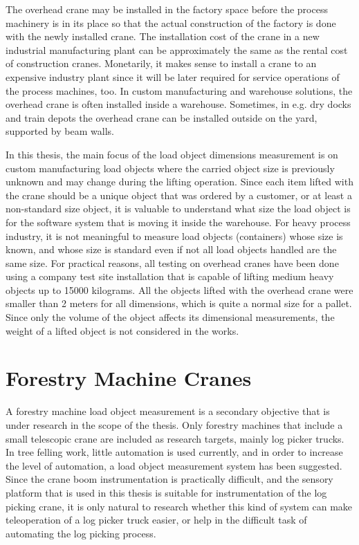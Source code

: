 \documentclass[12pt,a4paper,oneside,pdftex]{report}
\begin{document}
    The overhead crane may be installed in the factory space before the process machinery is in its place so that the actual construction of the factory is done with the newly installed crane. The installation cost of the crane in a new industrial manufacturing plant can be approximately the same as the rental cost of construction cranes. Monetarily, it makes sense to install a crane to an expensive industry plant since it will be later required for service operations of the process machines, too. In custom manufacturing and warehouse solutions, the overhead crane is often installed inside a warehouse. Sometimes, in e.g. dry docks and train depots the overhead crane can be installed outside on the yard, supported by beam walls.\par
    In this thesis, the main focus of the load object dimensions measurement is on custom manufacturing load objects where the carried object size is previously unknown and may change during the lifting operation. Since each item lifted with the crane should be a unique object that was ordered by a customer, or at least a non-standard size object, it is valuable to understand what size the load object is for the software system that is moving it inside the warehouse. For heavy process industry, it is not meaningful to measure load objects (containers) whose size is known, and whose size is standard even if not all load objects handled are the same size. For practical reasons, all testing on overhead cranes have been done using a company test site installation that is capable of lifting medium heavy objects up to 15000 kilograms. All the objects lifted with the overhead crane were smaller than 2 meters for all dimensions, which is quite a normal size for a pallet. Since only the volume of the object affects its dimensional measurements, the weight of a lifted object is not considered in the works.\par

\section{Forestry Machine Cranes}
\label{section:forestry_machines_cranes}

A forestry machine load object measurement is a secondary objective that is under research in the scope of the thesis. Only forestry machines that include a small telescopic crane are included as research targets, mainly log picker trucks. In tree felling work, little automation is used currently, and in order to increase the level of automation, a load object measurement system has been suggested. Since the crane boom instrumentation is practically difficult, and the sensory platform that is used in this thesis is suitable for instrumentation of the log picking crane, it is only natural to research whether this kind of system can make teleoperation of a log picker truck easier, or help in the difficult task of automating the log picking process. 
\end{document}
